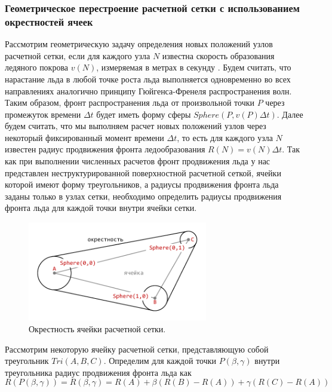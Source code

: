 \subsubsection{Геометрическое перестроение расчетной сетки с использованием окрестностей ячеек}

Рассмотрим геометрическую задачу определения новых положений узлов расчетной сетки, если для каждого узла $N$ известна скорость образования ледяного покрова $v(N)$, измеряемая в метрах в секунду \cite{Rybakov2023GeoRemesh}.
Будем считать, что нарастание льда в любой точке роста льда выполняется одновременно во всех направлениях аналогично принципу Гюйгенса-Френеля распространения волн.
Таким образом, фронт распространения льда от произвольной точки $P$ через промежуток времени $\Delta t$ будет иметь форму сферы $Sphere(P, v(P)\Delta t)$.
Далее будем считать, что мы выполняем расчет новых положений узлов через некоторый фиксированный момент времени $\Delta t$, то есть для каждого узла $N$ известен радиус продвижения фронта ледообразования $R(N) = v(N) \Delta t$.
Так как при выполнении численных расчетов фронт продвижения льда у нас представлен неструктурированной поверхностной расчетной сеткой, ячейки которой имеют форму треугольников, а радиусы продвижения фронта льда заданы только в узлах сетки, необходимо определить радиусы продвижения фронта льда для каждой точки внутри ячейки сетки.

\begin{figure}[ht]
\centering
\includegraphics[width=0.7\textwidth]{./pics/text_1_remesh_common_envelope/triangle.pdf}
\singlespacing
{}\caption{Окрестность ячейки расчетной сетки.}
\label{fig:text_1_remesh_common_envelope_1}
\end{figure}

Рассмотрим некоторую ячейку расчетной сетки, представляющую собой треугольник $Tri(A, B, C)$.
Определим для каждой точки $P(\beta,\gamma)$ внутри треугольника радиус продвижения фронта льда как
\begin{equation}
	R(P(\beta,\gamma)) = R(\beta,\gamma) = R(A) + \beta(R(B) - R(A)) + \gamma(R(C) - R(A))
\end{equation}

